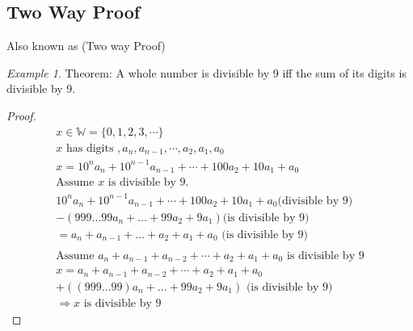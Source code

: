 \documentclass[11pt]{report}
\theoremstyle{remark}
\newtheorem*{example}{Example}
\begin{document}
	\subsection{Two Way Proof}
	Also known as (Two way Proof) 
	\begin{example}
		Theorem: A whole number is divisible by 9 iff the sum of its digits is divisible by 9.
		\begin{proof}
			\begin{gather}
				x \in \mathbb{W} = \{0, 1, 2, 3, \cdots\}\\ 
				x \text{ has digits }, a_n, a_{n - 1}, \cdots, a_2, a_1, a_0 \\
				x = 10^{n}a_n + 10^{n - 1}a_{n - 1} + \cdots + 100a_2 + 10a_1 + a_0\\
				\text{Assume } x \text{ is divisible by 9.}\\
				10^{n}a_n + 10^{n - 1}a_{n - 1} + \cdots + 100a_2 + 10a_1 + a_0 \text{(divisible by 9)}\\
				- (999\dots 99a_{n} + \dots + 99a_2 + 9a_1) \text{(is divisible by 9)} \\ 
				= a_n + a_{n - 1} + \dots  + a_2 + a_1 + a_0 \text{ (is divisible by 9)}\\ \\
				\text{Assume } a_n + a_{n - 1} + a_{n - 2} + \cdots + a_2 + a_1 + a_0  \text{ is divisible by 9} \\
				x = a_n + a_{n - 1} + a_{n - 2} + \cdots + a_2 + a_1 + a_0  \\
				+ ((999\dots 99)a_n + \dots + 99a_2 + 9a_1) \text{ (is divisible by 9)} \\
				\Rightarrow x \text{ is divisible by 9}
			\end{gather}
		\end{proof}
	\end{example}
	
\end{document}
